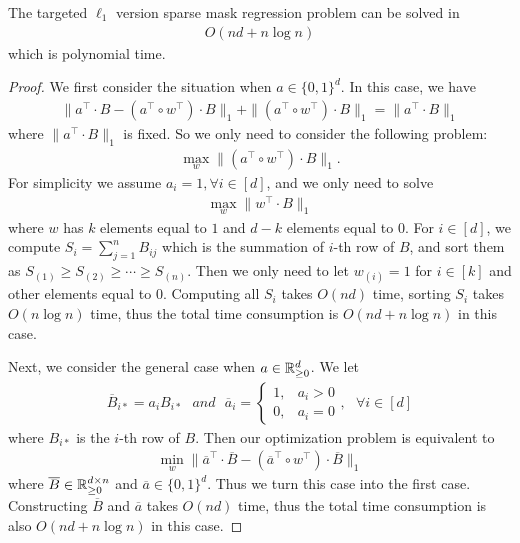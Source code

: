 \begin{lemma}\label{lem:mask_regreesion_vector_ell_1}
The targeted $\ell_1$ version sparse mask regression problem can be solved in 
\begin{align*}
    O(nd + n\log n)
\end{align*}
which is polynomial time.
\end{lemma}
\begin{proof}
We first consider the situation when $a\in\{0,1\}^d$. In this case, we have
\begin{align*}
    \|a^\top \cdot B -  (a^\top \circ w^\top) \cdot B\|_1 + \|(a^\top \circ w^\top) \cdot B\|_1 = \|a^\top \cdot B\|_1
\end{align*}
where $\|a^\top \cdot B\|_1$ is fixed. So we only need to consider the following problem:
\begin{align*}
    \max_{w} \|(a^\top \circ w^\top) \cdot B\|_1.
\end{align*}
For simplicity we assume $a_i = 1, \forall i \in [d]$, and we only need to solve
\begin{align*}
    \max_{w} \|w^\top \cdot B\|_1
\end{align*}
where $w$ has $k$ elements equal to $1$ and $d-k$ elements equal to $0$. For $i\in[d]$, we compute $S_i = \sum_{j=1}^n B_{ij}$ which is the summation of $i$-th row of $B$, and sort them as $S_{(1)} \geq S_{(2)}\geq \cdots \geq S_{(n)}$. Then we only need to let $w_{(i)} = 1$ for $i\in [k]$ and other elements equal to $0$. Computing all $S_i$ takes $O(nd)$ time, sorting $S_i$ takes $O(n\log n)$ time, thus the total time consumption is $O(nd + n\log n)$ in this case.

Next, we consider the general case when $a\in\mathbb{R}_{\geq 0}^d$. We let
\begin{align*}
    \overline{B}_{i*} = a_i B_{i*} ~~~ and ~~~ \overline{a}_i = 
    \begin{cases}
    1, & a_i > 0 \\
    0, & a_i = 0
    \end{cases},
    ~~~ \forall i \in [d]
\end{align*}
where $B_{i*}$ is the $i$-th row of $B$. Then our optimization problem is equivalent to
\begin{align*}
    \min_{w}\|\overline{a}^\top \cdot \overline{B} - (\overline{a}^\top \circ w^\top) \cdot \overline{B}\|_1
\end{align*}
where $\overline{B}\in\mathbb{R}_{\geq 0}^{d\times n}$ and $\overline{a} \in \{0,1\}^d$. Thus we turn this case into the first case. Constructing $\overline{B}$ and $\overline{a}$ takes $O(nd)$ time, thus the total time consumption is also $O(nd +n\log n)$ in this case.
\end{proof}

